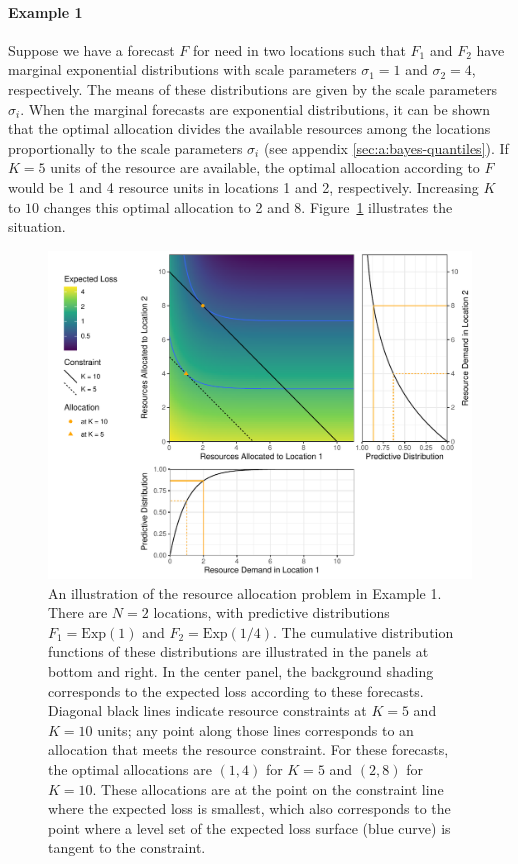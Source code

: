 \documentclass{article}\usepackage[]{graphicx}\usepackage[]{xcolor}
\begin{document}
\paragraph{Example 1} Suppose we have a forecast $F$ for need in two locations such that $F_1$ and $F_2$ have marginal exponential distributions with scale parameters $\sigma_1 = 1$ and $\sigma_2 = 4$, respectively.  The means of these distributions are
given by the scale parameters $\sigma_i$. When the marginal forecasts are exponential distributions, it can be shown
that the optimal allocation divides the available resources among the locations proportionally to the scale parameters
$\sigma_i$ (see appendix \ref{sec:a:bayes-quantiles}). If $K = 5$ units of the resource are
available, the optimal allocation according to $F$ would be 1 and 4 resource units in locations 1 and 2, respectively. 
Increasing $K$ to $10$ changes this optimal allocation to 2 and 8. Figure~\ref{fig:exp_alloc_example} illustrates the 
situation.

\begin{figure}
    \includegraphics[width=\textwidth]{../figures/exponential_pred_expected_loss.pdf}
    \caption{An illustration of the resource allocation problem in Example 1. There are $N = 2$ locations, with
    predictive distributions $F_1 = \mathrm{Exp}(1)$ and $F_2 = \mathrm{Exp}(1/4)$. The cumulative distribution
    functions of these distributions are illustrated in the panels at bottom and right. In the center panel, the
    background shading corresponds to the expected loss according to these forecasts. Diagonal black lines indicate
    resource constraints at $K=5$ and $K=10$ units; any point along those lines corresponds to an allocation that meets
    the resource constraint. For these forecasts, the optimal allocations are $(1, 4)$ for $K=5$ and $(2, 8)$ for
    $K=10$. These allocations are at the point on the constraint line where the expected loss is smallest, which also
    corresponds to the point where a level set of the expected loss surface (blue curve) is tangent to the constraint.}
    \label{fig:exp_alloc_example}
\end{figure}
\end{document}
